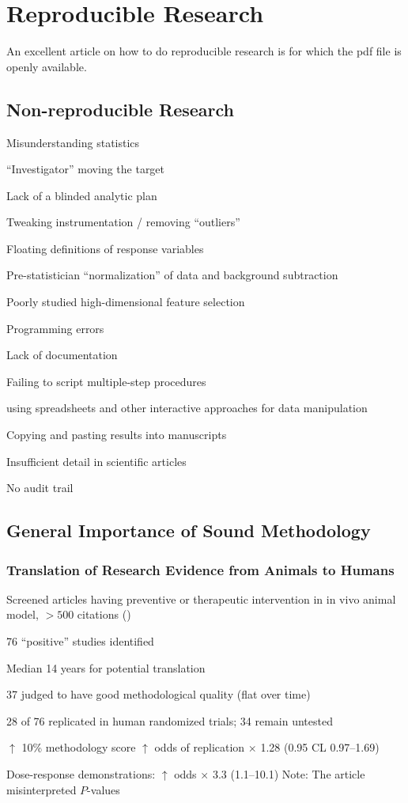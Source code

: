 \chapter{Reproducible Research}

An excellent article on how to do reproducible research is
\cite{mun17man} for which the pdf file is openly available.

\section{Non-reproducible Research}
\bi
\item Misunderstanding statistics
\item ``Investigator'' moving the target
\item Lack of a blinded analytic plan
\item Tweaking instrumentation / removing ``outliers''
\item Floating definitions of response variables
\item Pre-statistician ``normalization'' of data and background subtraction 
\item Poorly studied high-dimensional feature selection
\item Programming errors
\item Lack of documentation
\item Failing to script multiple-step procedures
 \bi
 \item using spreadsheets and other interactive approaches for data
 manipulation
 \ei
\item Copying and pasting results into manuscripts
\item Insufficient detail in scientific articles
\item No audit trail
\ei

\section{General Importance of Sound Methodology}
\subsection{Translation of Research Evidence from Animals to Humans}
\bi
\item Screened articles having preventive or therapeutic intervention
  in in vivo animal model, $> 500$ citations (\citet{hac06tra}) 
\item 76 ``positive'' studies identified
\item Median 14 years for potential translation
\item 37 judged to have good methodological quality (flat over time)
\item 28 of 76 replicated in human randomized trials; 34 remain untested
\item $\uparrow$ 10\% methodology score $\uparrow$ odds of
replication $\times$ 1.28 (0.95 CL 0.97--1.69)
\item Dose-response demonstrations: $\uparrow$ odds $\times$ 3.3 (1.1--10.1)
\ei
Note: The article misinterpreted $P$-values

